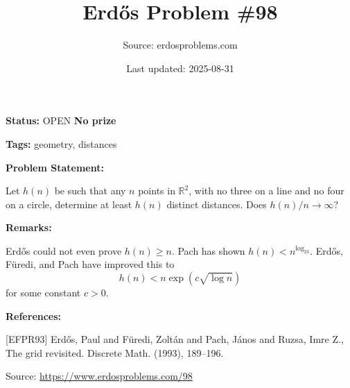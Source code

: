 \documentclass{article}
\title{Erd\H{o}s Problem \#98}
\date{Last updated: 2025-08-31}
\author{Source: erdosproblems.com}
\begin{document}
\maketitle

\noindent\textbf{Status:} OPEN \quad \textbf{No prize}

\noindent\textbf{Tags:} geometry, distances

\medskip
\noindent\textbf{Problem Statement:}

Let $h(n)$ be such that any $n$ points in $\mathbb{R}^2$, with no three on a line and no four on a circle, determine at least $h(n)$ distinct distances. Does $h(n)/n\to \infty$?

\bigskip
\noindent\textbf{Remarks:}

Erd\H{o}s could not even prove $h(n)\geq n$. Pach has shown $h(n)<n^{\log_23}$. Erd\H{o}s, F\"{u}redi, and Pach \cite{EFPR93} have improved this to\[h(n) < n\exp(c\sqrt{\log n})\]for some constant $c>0$.

\bigskip
\noindent\textbf{References:}

[EFPR93] Erd\H{o}s, Paul and F\"{u}redi, Zolt\'{a}n and Pach, J\'{a}nos and
Ruzsa, Imre Z., The grid revisited. Discrete Math. (1993), 189--196.

\bigskip
\noindent\small{Source: \url{https://www.erdosproblems.com/98}}
\end{document}
